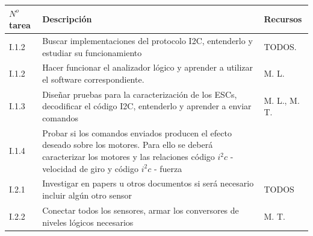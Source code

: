 \documentclass[spanish,12pt,a4paper,titlepage]{report}
\begin{document}
\begin{table}[H]
\begin{tabular}{|p{50pt}|p{250pt}|p{100pt}|} 
\hline
\cellcolor[gray]{0.8} $N^o$ \textbf{tarea} & \cellcolor[gray]{0.8} \textbf{Descripción} & \cellcolor[gray]{0.8} \textbf{Recursos} \\ \hline
I.1.2  & Buscar implementaciones del protocolo I2C, entenderlo y estudiar su funcionamiento & TODOS.\\ \hline
I.1.2  & Hacer funcionar el analizador lógico y aprender a utilizar el software correspondiente. & M. L.\\ \hline
I.1.3  & Diseñar pruebas para la caracterización de los ESCs, decodificar el código I2C, entenderlo y aprender a enviar comandos & M. L., M. T.\\ \hline
I.1.4  & Probar si los comandos enviados producen el efecto deseado sobre los motores. Para ello se deberá caracterizar los motores y las relaciones código $i^2c$ - velocidad de giro y código $i^2c$ - fuerza & \\ \hline
I.2.1  & Investigar en papers u otros documentos si será necesario incluir algún otro sensor & TODOS \\ \hline
I.2.2  & Conectar todos los sensores, armar los conversores de niveles lógicos necesarios & M. T. \\ \hline
\end{tabular}
\end{table}
\end{document}
